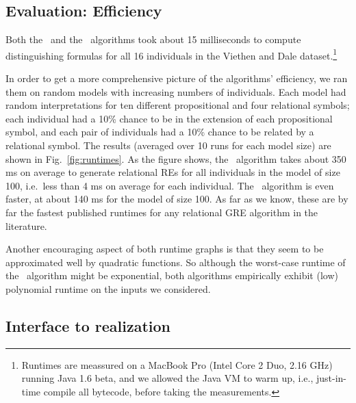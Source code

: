 \subsection{Evaluation: Efficiency}

Both the \el\ and the \alc\ algorithms took about 15 milliseconds to
compute distinguishing formulas for all 16 individuals in the Viethen
and Dale dataset.\footnote{Runtimes are meassured on a MacBook Pro
  (Intel Core 2 Duo, 2.16 GHz) running Java 1.6 beta, and we allowed the
  Java VM to warm up, i.e., just-in-time compile all bytecode, before
  taking the measurements.}

In order to get a more comprehensive picture of the algorithms'
efficiency, we ran them on random models with increasing numbers of
individuals.  Each model had random interpretations for ten different
propositional and four relational symbols; each individual had a 10\%
chance to be in the extension of each propositional symbol, and each
pair of individuals had a 10\% chance to be related by a relational
symbol.  The results (averaged over 10 runs for each model size) are
shown in Fig.~\ref{fig:runtimes}.  As the figure shows, the \el\
algorithm takes about 350 ms on average to generate relational REs for
all individuals in the model of size 100, i.e.\ less than 4 ms on
average for each individual.  The \alc\ algorithm is even faster, at
about 140 ms for the model of size 100.  As far as we know, these are
by far the fastest published runtimes for any relational GRE algorithm
in the literature.

Another encouraging aspect of both runtime graphs is that they seem to
be approximated well by quadratic functions.  So although the
worst-case runtime of the \el\ algorithm might be exponential, both
algorithms empirically exhibit (low) polynomial runtime on the inputs
we considered.



\subsection{Interface to realization}
\label{sec:discussion-realization}


